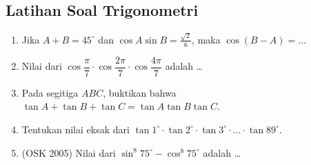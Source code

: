 \subsection{Latihan Soal Trigonometri}
\begin{enumerate}
	\item Jika $A+B=45^\circ$ dan $\cos A\sin B=\frac{\sqrt{2}}{6}$, maka $\cos(B-A)=\dots$
	
	\item Nilai dari $\cos \dfrac{\pi}{7}\cdot \cos \dfrac{2\pi}{7} \cdot \cos \dfrac{4\pi}{7}$ adalah \dots
	
	\item Pada segitiga $ABC$, buktikan bahwa $\tan A + \tan B + \tan C = \tan A \tan B \tan C$.
	
	\item Tentukan nilai eksak dari $\tan 1^\circ \cdot \tan 2^\circ \cdot \tan 3^\circ \cdot \ldots \cdot \tan 89^\circ$.
	
	\item (OSK 2005) Nilai dari $\sin^8 75^\circ - \cos^8 75^\circ$ adalah \dots
\end{enumerate}